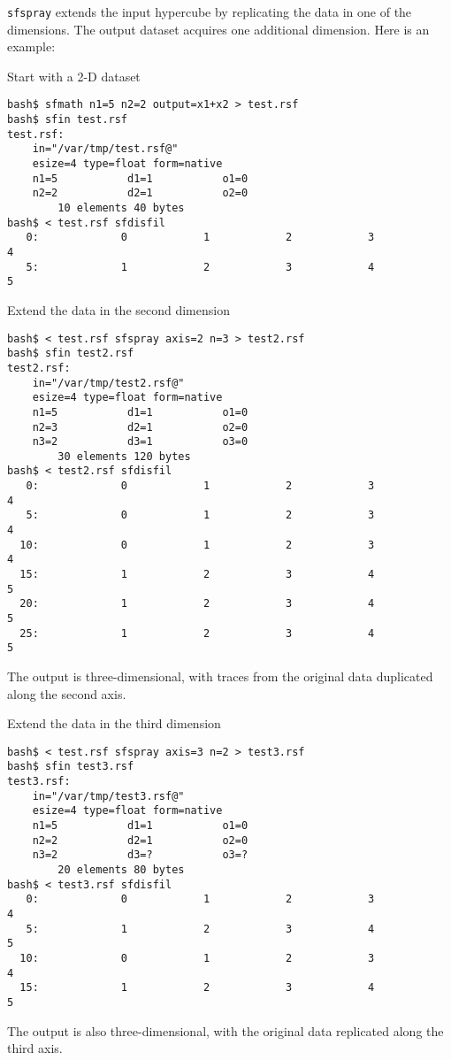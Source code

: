 \texttt{sfspray} extends the input hypercube by replicating the data
in one of the dimensions. The output dataset acquires one additional
dimension. Here is an example:

Start with a 2-D dataset
\begin{verbatim}
bash$ sfmath n1=5 n2=2 output=x1+x2 > test.rsf
bash$ sfin test.rsf
test.rsf:
    in="/var/tmp/test.rsf@"
    esize=4 type=float form=native 
    n1=5           d1=1           o1=0          
    n2=2           d2=1           o2=0          
        10 elements 40 bytes
bash$ < test.rsf sfdisfil
   0:             0            1            2            3            4
   5:             1            2            3            4            5
\end{verbatim}

Extend the data in the second dimension
\begin{verbatim}
bash$ < test.rsf sfspray axis=2 n=3 > test2.rsf
bash$ sfin test2.rsf
test2.rsf:
    in="/var/tmp/test2.rsf@"
    esize=4 type=float form=native 
    n1=5           d1=1           o1=0          
    n2=3           d2=1           o2=0          
    n3=2           d3=1           o3=0          
        30 elements 120 bytes
bash$ < test2.rsf sfdisfil
   0:             0            1            2            3            4
   5:             0            1            2            3            4
  10:             0            1            2            3            4
  15:             1            2            3            4            5
  20:             1            2            3            4            5
  25:             1            2            3            4            5
\end{verbatim}
The output is three-dimensional, with traces from the original
data duplicated along the second axis.

Extend the data in the third dimension
\begin{verbatim}
bash$ < test.rsf sfspray axis=3 n=2 > test3.rsf
bash$ sfin test3.rsf
test3.rsf:
    in="/var/tmp/test3.rsf@"
    esize=4 type=float form=native 
    n1=5           d1=1           o1=0          
    n2=2           d2=1           o2=0          
    n3=2           d3=?           o3=?          
        20 elements 80 bytes
bash$ < test3.rsf sfdisfil
   0:             0            1            2            3            4
   5:             1            2            3            4            5
  10:             0            1            2            3            4
  15:             1            2            3            4            5
\end{verbatim}
The output is also three-dimensional, with the original data replicated
along the third axis.

